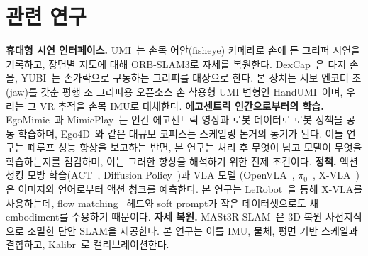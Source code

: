 \documentclass[conference,10pt]{IEEEtran}
\begin{document}
\section{관련 연구}\label{sec:related}
\textbf{휴대형 시연 인터페이스.} UMI~\cite{chi2024umi}는 손목 어안(fisheye) 카메라로 손에 든 그리퍼 시연을 기록하고, 장면별 지도에
대해 ORB-SLAM3로 자세를 복원한다. DexCap~\cite{wang2024dexcap}은 다지 손을, YUBI~\cite{ohkawa2026yubi}는 손가락으로 구동하는 그리퍼를
대상으로 한다. 본 장치는 서보 엔코더 조(jaw)를 갖춘 평행 조 그리퍼용 오픈소스 손 착용형 UMI 변형인 HandUMI~\cite{handumi_hw}이며,
우리는 그 VR 추적을 손목 IMU로 대체한다.
\textbf{에고센트릭 인간으로부터의 학습.} EgoMimic~\cite{kareer2024egomimic}과 MimicPlay~\cite{wang2023mimicplay}는 인간 에고센트릭
영상과 로봇 데이터로 로봇 정책을 공동 학습하며, Ego4D~\cite{grauman2022ego4d}와 같은 대규모 코퍼스는 스케일링 논거의 동기가 된다.
이들 연구는 폐루프 성능 향상을 보고하는 반면, 본 연구는 처리 후 무엇이 남고 모델이 무엇을 학습하는지를 점검하며, 이는 그러한 향상을
해석하기 위한 전제 조건이다.
\textbf{정책.} 액션 청킹 모방 학습(ACT~\cite{zhao2023act}, Diffusion Policy~\cite{chi2023diffusion})과 VLA 모델
(OpenVLA~\cite{kim2024openvla}, $\pi_0$~\cite{black2024pi0}, X-VLA~\cite{zheng2025xvla})은 이미지와 언어로부터 액션 청크를 예측한다.
본 연구는 LeRobot~\cite{cadene2024lerobot}을 통해 X-VLA를 사용하는데, flow matching~\cite{lipman2023flow} 헤드와 soft prompt가 작은
데이터셋으로도 새 embodiment를 수용하기 때문이다.
\textbf{자세 복원.} MASt3R-SLAM~\cite{murai2025mast3rslam}은 3D 복원 사전지식으로 조밀한 단안 SLAM을 제공한다. 본 연구는 이를 IMU,
물체, 평면 기반 스케일과 결합하고, Kalibr~\cite{furgale2013kalibr}로 캘리브레이션한다.
\end{document}
